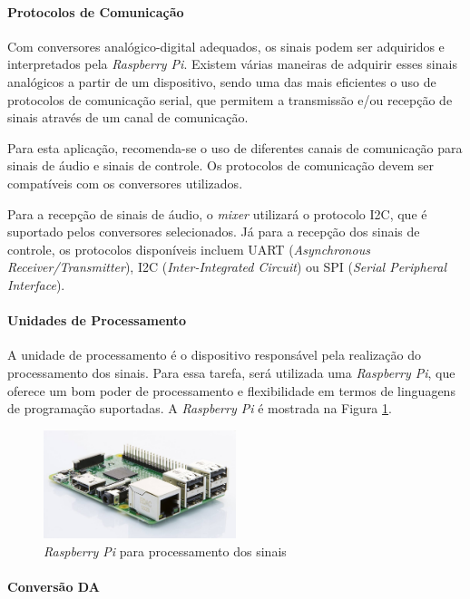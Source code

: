 \paragraph{Protocolos de Comunicação}
Com conversores analógico-digital adequados, os sinais podem ser adquiridos e interpretados pela \textit{Raspberry Pi}. Existem várias maneiras de adquirir esses sinais analógicos a partir de um dispositivo, sendo uma das mais eficientes o uso de protocolos de comunicação serial, que permitem a transmissão e/ou recepção de sinais através de um canal de comunicação.

Para esta aplicação, recomenda-se o uso de diferentes canais de comunicação para sinais de áudio e sinais de controle. Os protocolos de comunicação devem ser compatíveis com os conversores utilizados.

Para a recepção de sinais de áudio, o \textit{mixer} utilizará o protocolo I2C, que é suportado pelos conversores selecionados. Já para a recepção dos sinais de controle, os protocolos disponíveis incluem UART (\textit{Asynchronous Receiver/Transmitter}), I2C (\textit{Inter-Integrated Circuit}) ou SPI (\textit{Serial Peripheral Interface}).

\paragraph{Unidades de Processamento}

A unidade de processamento é o dispositivo responsável pela realização do processamento dos sinais. Para essa tarefa, será utilizada uma \textit{Raspberry Pi}, que oferece um bom poder de processamento e flexibilidade em termos de linguagens de programação suportadas. A \textit{Raspberry Pi} é mostrada na Figura \ref{fig65}.

\begin{figure}[h]
    \centering
    \includegraphics[width=0.5\textwidth]{figuras/fig65.jpg}
    \caption{\textit{Raspberry Pi} para processamento dos sinais \cite{adrenalineDisplaysLanar}}
    \label{fig65}
\end{figure}

\paragraph{Conversão DA}

